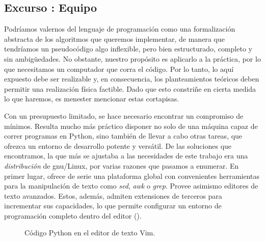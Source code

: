 \subsection{Excurso : Equipo}
Podríamos valernos del lenguaje de programación como una formalización abstracta de los algoritmos que queremos implementar, de manera que tendríamos un pseudocódigo algo inflexible, pero bien estructurado, completo y sin ambigüedades. No obstante, nuestro propósito es aplicarlo a la práctica, por lo que necesitamos un computador que corra el código. Por lo tanto, lo aquí expuesto debe ser realizable y, en consecuencia, los planteamientos teóricos deben permitir una realización física factible. Dado que esto constriñe en cierta medida lo  que haremos, es menester mencionar estas cortapisas.

Con un presupuesto limitado, se hace necesario encontrar un compromiso de mínimos. Resulta mucho más práctico disponer no solo de una máquina capaz de correr programas en Python, sino también de llevar a cabo otras tareas, que ofrezca un entorno de desarrollo potente y versátil. De las soluciones que encontramos, la que más se ajustaba a las necesidades de este trabajo era una \textit{distribución} de \ac{gnu}/Linux, por varias razones que pasamos a enumerar. En primer lugar, ofrece de serie una plataforma global con convenientes herramientas para la manipulación de texto como \textit{sed}, \textit{awk} o \textit{grep}. Provee asimismo editores de texto avanzados. Estos, además, admiten extensiones de terceros para incrementar sus capacidades, lo que permite configurar un entorno de programación completo dentro del editor ().

\begin{figure}[!ht]
	\centering\small
	\caption{Código Python en el editor de texto Vim.}
	\label{fig:vim}
\end{figure}

